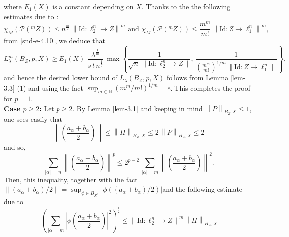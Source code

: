\documentclass[a4paper,11pt, reqno]{amsart}
\theoremstyle{definition}
\newcommand{\real}{{\operatorname{Re}\,}}
\newcommand{\norm}[1]{\left\lVert#1\right\rVert}
\begin{document}
	where $E_{1}(X)$ is a constant depending on $X$. Thanks to the the following estimates due to \cite[(4.5), (4.6), pp. 187]{defant-2003}:
	\begin{equation} \label{snd-e-4.10-a}
		\chi_{M}(\mathcal{P}(^m Z)) \leq n^{\frac{m}{2}}\, \norm{\mathrm{Id}:\ell^n_2 \rightarrow Z}^m\,\, \mbox{and}\,\, \chi_{M}(\mathcal{P}(^m Z)) \leq \frac{m^m}{m!}\, \norm{\mathrm{Id}: Z \rightarrow \ell^n_1}^m,
	\end{equation}
	from \eqref{snd-e-4.10}, we deduce that 
	\begin{equation*}
		L^{m}_{\lambda}(B_{Z}, p,X) \geq E_{1}(X)\,  \,\frac{\lambda^{\frac{1}{m}}}{s\,t\, n^{\frac{1}{q}}}\, \max \left\{\frac{1}{\sqrt{n}\, \norm{\mathrm{Id}: \ell^n_{2} \rightarrow Z}}, \, \frac{1}{\left(\frac{m^m}{m!}\right)^{1/m}\, \norm{\mathrm{Id}: Z \rightarrow \ell^n_{1}}}\right\},
	\end{equation*}
	and hence the desired lower bound of $L_{\lambda}(B_{Z}, p,X)$ follows from Lemma \ref{lem-3.3} (1) and using the fact $\sup _{m \in \mathbb{N}} (m^m/m!)^{1/m} =e$. This completes the proof for $p=1$.
	\\ [1mm]
	\underline{{\bf Case $p\geq 2$:}} Let $p\geq 2$. By Lemma \ref{lem-3.1} and keeping in mind $\norm{P}_{B_Z,X} \leq 1$, one sees easily that
	\begin{equation*}
		\norm{\left(\frac{a_{\alpha} + b_{\alpha}}{2}\right)} \leq  \norm{H}_{B_Z,X} \leq 2\, \norm{P}_{B_Z,X} \leq 2
	\end{equation*}
	and so, 
	$$\sum_{|\alpha|=m} \norm{\left(\frac{a_{\alpha} + b_{\alpha}}{2}\right)}^p \leq 2^{p-2}\, \sum_{|\alpha|=m} \norm{\left(\frac{a_{\alpha} + b_{\alpha}}{2}\right)}^2.
	$$
	Then, this inequality, together with the fact $\norm{(a_{\alpha}+b_{\alpha})/2}=\sup_{\phi \in B_{X^{*}}}|\phi((a_{\alpha}+b_{\alpha})/2)|$and the following estimate due to \cite[p. 187]{defant-2003}
	\begin{equation*}
		\left(\sum_{|\alpha|=m} \left|\phi\left(\frac{a_{\alpha} + b_{\alpha}}{2}\right)\right|^2\right)^{\frac{1}{2}} \leq \norm{\mathrm{Id}:\ell^n _2 \rightarrow Z}^{m} \norm{H}_{B_{Z},X}
	\end{equation*}
\end{document}
